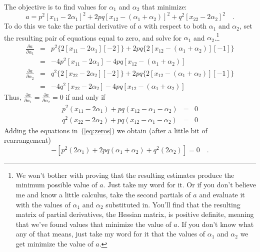 \documentclass[12pt]{article}
\begin{document}
The objective is to find values for $\alpha_1$ and $\alpha_2$ that
minimize:
\[
a = p^2[x_{11}-2\alpha_1]^2
       + 2pq[x_{12}-(\alpha_1+\alpha_2)]^2
       + q^2[x_{22}-2\alpha_2]^2 \quad .
\]
To do this we take the partial derivative of $a$ with respect to both
$\alpha_1$ and $\alpha_2$, set the resulting pair of equations equal
to zero, and solve for $\alpha_1$ and $\alpha_2$.\footnote{We won't
  bother with proving that the resulting estimates produce the minimum
  possible value of $a$. Just take my word for it. Or if you don't
  believe me and know a little calculus, take the second partials of
  $a$ and evaluate it with the values of $\alpha_1$ and $\alpha_2$
  substituted in. You'll find that the resulting matrix of partial
  derivatives, the Hessian matrix, is positive definite, meaning that
  we've found values that minimize the value of $a$. If you don't know
  what any of that means, just take my word for it that the values of
  $\alpha_1$ and $\alpha_2$ we get minimize the value of $a$.}
\begin{eqnarray*}
\frac{\partial a}{\partial{\alpha_1}} &=& p^2\{2[x_{11} - 2\alpha_1][-2]\}
                     + 2pq\{2[x_{12} - (\alpha_1+\alpha_2)][-1]\} \\
                  &=& -4p^2[x_{11} - 2\alpha_1]
                     -4pq[x_{12} - (\alpha_1+\alpha_2)] \\
\frac{\partial a}{\partial{\alpha_2}} &=& q^2\{2[x_{22} - 2\alpha_2][-2]\}
                     + 2pq\{2[x_{12} - (\alpha_1+\alpha_2)][-1]\} \\
                  &=& -4q^2[x_{22} - 2\alpha_2]
                     -4pq[x_{12} - (\alpha_1+\alpha_2)]
\end{eqnarray*}
Thus, $\frac{\partial a}{\partial{\alpha_1}} = \frac{\partial a}{\partial{\alpha_2}} = 0$ if and only if
\begin{eqnarray}
p^2(x_{11} - 2\alpha_1) + pq(x_{12} - \alpha_1 - \alpha_2) &=& 0
  \nonumber \\
q^2(x_{22} - 2\alpha_2) + pq(x_{12} - \alpha_1 - \alpha_2) &=& 0
\label{eq:zeros}
\end{eqnarray}
Adding the equations in~(\ref{eq:zeros}) we obtain (after a little bit
of rearrangement)
\begin{equation}
[p^2x_{11} + 2pqx_{12} + q^2x_{22}] -
   [p^2(2\alpha_1) + 2pq(\alpha_1 + \alpha_2) + q^2(2\alpha_2)] = 0 \quad .
\label{eq:basic}
\end{equation}
\end{document}
